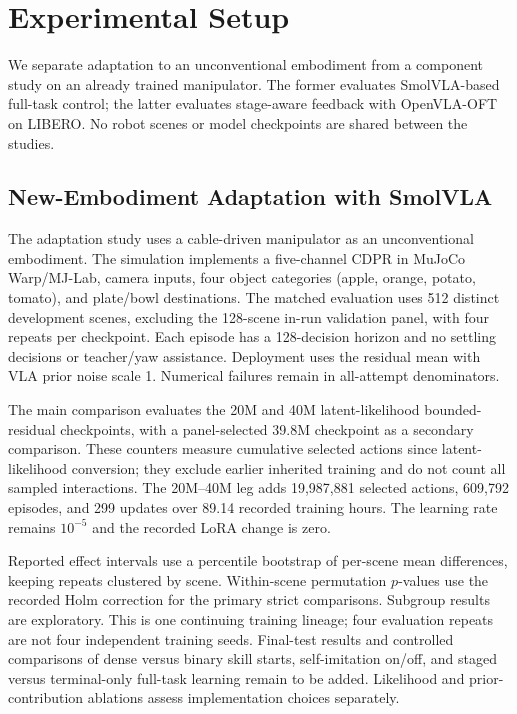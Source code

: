 \section{Experimental Setup}\label{sec:setup}
We separate adaptation to an unconventional embodiment from a component study on an already trained manipulator. The former evaluates SmolVLA-based full-task control; the latter evaluates stage-aware feedback with OpenVLA-OFT on LIBERO. No robot scenes or model checkpoints are shared between the studies.

\subsection{New-Embodiment Adaptation with SmolVLA}
The adaptation study uses a cable-driven manipulator as an unconventional embodiment. The simulation implements a five-channel CDPR in MuJoCo Warp/MJ-Lab, camera inputs, four object categories (apple, orange, potato, tomato), and plate/bowl destinations. The matched evaluation uses 512 distinct development scenes, excluding the 128-scene in-run validation panel, with four repeats per checkpoint. Each episode has a 128-decision horizon and no settling decisions or teacher/yaw assistance. Deployment uses the residual mean with VLA prior noise scale 1. Numerical failures remain in all-attempt denominators. 

The main comparison evaluates the 20M and 40M latent-likelihood bounded-residual checkpoints, with a panel-selected 39.8M checkpoint as a secondary comparison. These counters measure cumulative selected actions since latent-likelihood conversion; they exclude earlier inherited training and do not count all sampled interactions. The 20M--40M leg adds 19,987,881 selected actions, 609,792 episodes, and 299 updates over 89.14 recorded training hours. The learning rate remains $10^{-5}$ and the recorded LoRA change is zero.

Reported effect intervals use a percentile bootstrap of per-scene mean differences, keeping repeats clustered by scene. Within-scene permutation $p$-values use the recorded Holm correction for the primary strict comparisons. Subgroup results are exploratory. This is one continuing training lineage; four evaluation repeats are not four independent training seeds. Final-test results and controlled comparisons of dense versus binary skill starts, self-imitation on/off, and staged versus terminal-only full-task learning remain to be added. Likelihood and prior-contribution ablations assess implementation choices separately.



